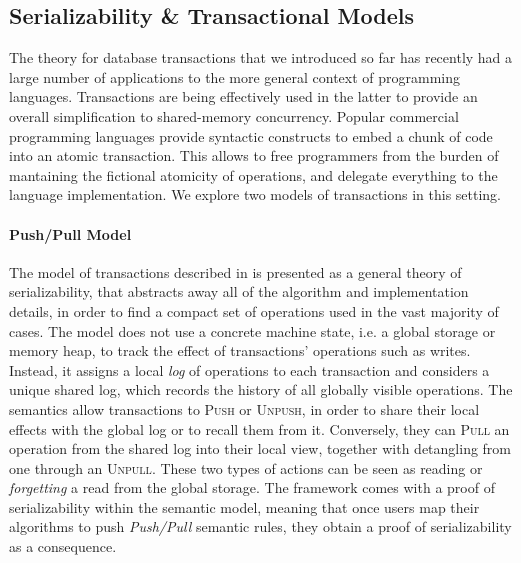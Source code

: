 \subsection{Serializability \& Transactional Models}

\label{sec:serTransMod}

The theory for database transactions that we introduced so far has recently had a large number of applications to the more general context of programming languages. Transactions are being effectively used in the latter to provide an overall simplification to shared-memory concurrency. Popular commercial programming languages provide syntactic constructs to embed a chunk of code into an atomic transaction. This allows to free programmers from the burden of mantaining the fictional atomicity of operations, and delegate everything to the language implementation. We explore two models of transactions in this setting.

\paragraph{Push/Pull Model}
The model of transactions described in \cite{pushPull} is presented as a general theory of serializability, that abstracts away all of the algorithm and implementation details, in order to find a compact set of operations used in the vast majority of cases. The model does not use a concrete machine state, i.e. a global storage or memory heap, to track the effect of transactions' operations such as writes. Instead, it assigns a local \textit{log} of operations to each transaction and considers a unique shared log, which records the history of all globally visible operations. The semantics allow transactions to \textsc{Push} or \textsc{Unpush}, in order to share their local effects with the global log or to recall them from it. Conversely, they can \textsc{Pull} an operation from the shared log into their local view, together with detangling from one through an \textsc{Unpull}. These two types of actions can be seen as reading or \textit{forgetting} a read from the global storage. The framework comes with a proof of serializability within the semantic model, meaning that once users map their algorithms to push \textit{Push/Pull} semantic rules, they obtain a proof of serializability as a consequence.

